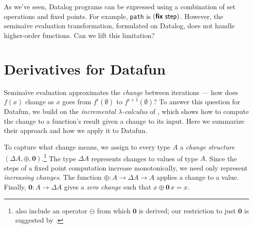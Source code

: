 \documentclass[sigplan,screen,review,timestamp,dvipsnames]{acmart}
\newcommand{\naive}{na\"ive}
\newcommand{\Naive}{Na\"ive}
\newcommand{\D}{\Delta}
\renewcommand{\d}{\delta}
\newcommand{\zero}{\mathbf{0}}
\newcommand{\kw}[1]{\textsf{\bfseries #1}}
\newcommand{\tlv}[1]{\textsf{#1}}
\newcommand{\var}[1]{\mathit{#1}}
\newcommand{\dee}[1]{\var{d#1}}
\newcommand{\efix}{\kw{fix}~}
\begin{document}
As we've seen, Datalog programs can be expressed using a combination of set
operations and fixed points. For example, \texttt{path} is
$(\efix{\tlv{step}})$. However, the semi\naive{} evaluation transformation,
formulated on Datalog, does not handle higher-order functions. Can we lift this limitation?

\section{Derivatives for Datafun}




%
Semi\naive{} evaluation approximates the \emph{change} between iterations ---
how does $f(x)$ change as $x$ goes from $f^{i}(\emptyset)$ to
$f^{i+1}(\emptyset)$?
%
To answer this question for Datafun, we build on the \emph{incremental
  $\lambda$-calculus} of \citet{incremental}, which shows how to compute the
change to a function's result given a change to its input.
%
Here we summarize their approach and how we apply it to Datafun.


To capture what change means, we assign to every type $A$ a \emph{change
  structure} $(\D A, \oplus, \zero)$.\footnote{ also
  include an operator $\ominus$ from which $\zero$ is derived; our restriction
  to just $\zero$ is suggested by \citet{atkey-changes}.}
%
The type $\D A$ represents changes to values of type $A$. Since the steps of a fixed point computation increase monotonically, we need only represent \emph{increasing changes}.
%
The function $\oplus : A \to \Delta A \to A$ applies a change to a value.
Finally, $\zero : A \to \Delta A$ gives a \emph{zero change} such that $x \oplus
\zero\,x = x$.
\end{document}
